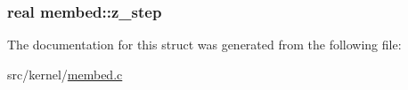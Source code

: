 \hypertarget{structmembed_a72482183740a02a120595695f905ee9c}{
\subsubsection[{z\-\_\-step}]{\setlength{\rightskip}{0pt plus 5cm}real {\bf membed\-::z\-\_\-step}}}\label{structmembed_a72482183740a02a120595695f905ee9c}


\-The documentation for this struct was generated from the following file\-:\begin{DoxyCompactItemize}
\item 
src/kernel/\hyperlink{membed_8c}{membed.\-c}\end{DoxyCompactItemize}
